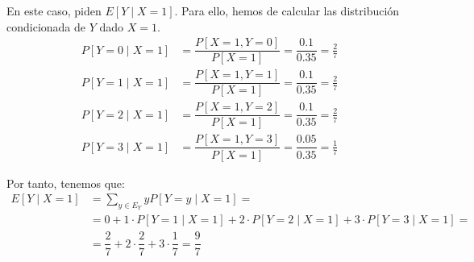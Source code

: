 \begin{ejercicio}
\begin{enumerate}
        En este caso, piden $E[Y\mid X = 1]$. Para ello, hemos de calcular las distribución condicionada de $Y$ dado $X = 1$.
        \begin{align*}
            P[Y = 0\mid X = 1] &= \dfrac{P[X = 1, Y = 0]}{P[X = 1]} = \dfrac{0.1}{0.35} = \frac{2}{7}\\
            P[Y = 1\mid X = 1] &= \dfrac{P[X = 1, Y = 1]}{P[X = 1]} = \dfrac{0.1}{0.35} = \frac{2}{7}\\
            P[Y = 2\mid X = 1] &= \dfrac{P[X = 1, Y = 2]}{P[X = 1]} = \dfrac{0.1}{0.35} = \frac{2}{7}\\
            P[Y = 3\mid X = 1] &= \dfrac{P[X = 1, Y = 3]}{P[X = 1]} = \dfrac{0.05}{0.35} = \frac{1}{7}
        \end{align*}

        Por tanto, tenemos que:
        \begin{align*}
            E[Y\mid X = 1] &= \sum_{y\in E_Y} y P[Y = y\mid X = 1] =\\&= 0+1\cdot P[Y = 1\mid X = 1] + 2\cdot P[Y = 2\mid X = 1] + 3\cdot P[Y = 3\mid X = 1]
            =\\&= \dfrac{2}{7} + 2\cdot \dfrac{2}{7} + 3\cdot \dfrac{1}{7} = \dfrac{9}{7}
        \end{align*}
    \end{enumerate}
\end{ejercicio}


